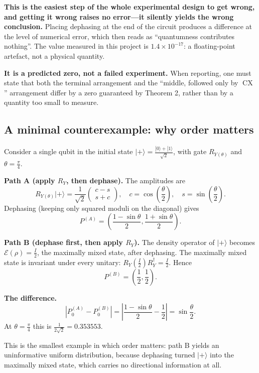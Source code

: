 \documentclass{article}
\begin{document}
\textbf{This is the easiest step of the whole experimental design to get
wrong, and getting it wrong raises no error---it silently yields the
wrong conclusion.} Placing dephasing at the end of the circuit produces
a difference at the level of numerical error, which then reads as
``quantumness contributes nothing''. The value measured in this project
is \(1.4 \times 10^{- 17}\): a floating-point artefact, not a physical
quantity.

\textbf{It is a predicted zero, not a failed experiment.} When
reporting, one must state that both the terminal arrangement and the
``middle, followed only by \(\operatorname{CX}\)'' arrangement differ by
a zero guaranteed by Theorem 2, rather than by a quantity too small to
measure.

\subsection{A minimal counterexample: why order matters}

Consider a single qubit in the initial state
\(| + \rangle = \frac{|0\rangle + |1\rangle}{\sqrt{2}}\), with gate
\(R_{Y(\theta)}\) and \(\theta = \frac{\pi}{4}\).

\textbf{Path A (apply \(R_{Y}\), then dephase).} The amplitudes are
\[R_{Y(\theta)}| + \rangle = \frac{1}{\sqrt{2}}\begin{pmatrix}
c - s \\
s + c
\end{pmatrix},\quad c = \cos(\frac{\theta}{2}),\quad s = \sin(\frac{\theta}{2}).\]
Dephasing (keeping only squared moduli on the diagonal) gives
\[P^{(A)} = \left( \frac{1 - \sin\theta}{2},\frac{1 + \sin\theta}{2} \right).\]

\textbf{Path B (dephase first, then apply \(R_{Y}\)).} The density
operator of \(| + \rangle\) becomes \(\mathcal{E}(\rho) = \frac{I}{2}\),
the maximally mixed state, after dephasing. The maximally mixed state is
invariant under every unitary:
\(R_{Y}\left( \frac{I}{2} \right)R_{Y}^{\dagger} = \frac{I}{2}\). Hence
\[P^{(B)} = \left( \frac{1}{2},\frac{1}{2} \right).\]

\textbf{The difference.}
\[|P_{0}^{(A)} - P_{0}^{(B)}| = |\frac{1 - \sin\theta}{2} - \frac{1}{2}| = \sin\frac{\theta}{2}.\]
At \(\theta = \frac{\pi}{4}\) this is
\(\frac{1}{2\sqrt{2}} = 0.353553\).

This is the smallest example in which order matters: path B yields an
uninformative uniform distribution, because dephasing turned
\(| + \rangle\) into the maximally mixed state, which carries no
directional information at all.
\end{document}
